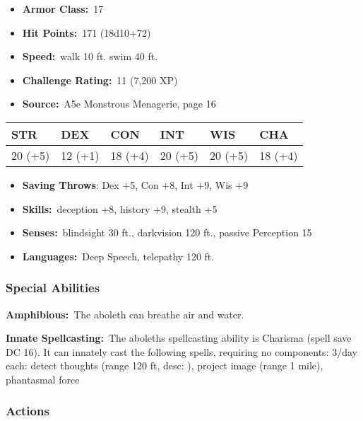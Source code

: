 \documentclass[10pt,twocolumn]{article}
\let\oldtextbf\textbf
\renewcommand{\textbf}[1]{\oldtextbf{{#1}}}
\providecommand{\tightlist}{
  \setlength{\itemsep}{4pt}
  \setlength{\topsep}{0pt}
  \setlength{\parsep}{0pt}
  \setlength{\parskip}{0pt}
  \setlength{\partopsep}{0pt}
}
\begin{document}
\setlength{\itemsep}{0pt}

\begin{itemize}
\tightlist
\item
  \textbf{Armor Class:}~17
\item
  \textbf{Hit Points:}~171 (18d10+72)
\item
  \textbf{Speed:}~walk 10 ft. swim 40 ft.
\item
  \textbf{Challenge Rating:}~11 (7,200 XP)
\item
  \textbf{Source:}~A5e Monstrous Menagerie, page 16
\end{itemize}

\begin{center}
{\sffamily\fontsize{8pt}{8pt}\selectfont
{}
\begin{tabular}{llllll}
\toprule
\textbf{STR} & \textbf{DEX} & \textbf{CON} & \textbf{INT} & \textbf{WIS} & \textbf{CHA} \\
\midrule
20 (+5) & 12 (+1) & 18 (+4) & 20 (+5) & 20 (+5) & 18 (+4) \\
\bottomrule
\end{tabular}}
\end{center}

\setlength{\itemsep}{0pt}

\begin{itemize}
\tightlist
\item
  \textbf{Saving Throws}: Dex +5, Con +8, Int +9, Wis +9
\item
  \textbf{Skills:}~deception +8, history +9, stealth +5
\item
  \textbf{Senses:}~blindsight 30 ft., darkvision 120 ft., passive
  Perception 15
\item
  \textbf{Languages:}~Deep Speech, telepathy 120 ft.
\end{itemize}

\subsubsection{Special Abilities}\label{special-abilities}

\textbf{Amphibious:}~The aboleth can breathe air and water.

\textbf{Innate Spellcasting:}~The aboleths spellcasting ability is
Charisma (spell save DC 16). It can innately cast the following spells,
requiring no components: 3/day each: detect thoughts (range 120 ft,
desc: ), project image (range 1 mile), phantasmal force

\subsubsection{Actions}\label{actions}
\end{document}

